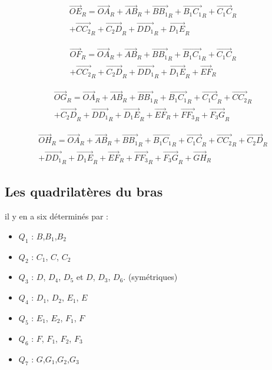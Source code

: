 \documentclass[12pt,a4paper]{article}
\begin{document}
\begin{equation}
\begin{split}
\vec{OE}_R=\vec{OA}_R+\vec{AB}_R+\vec{B B_1}_R+\vec{B_1 C_1}_R+\vec{C_1 C}_R\\+\vec{C C_2}_R+\vec{C_2 D}_R+\vec{D D_1}_R+\vec{D_1 E}_R
\end{split}
\end{equation}

\begin{equation}
\begin{split}
\vec{OF}_R=\vec{OA}_R+\vec{AB}_R+\vec{B B_1}_R+\vec{B_1 C_1}_R+\vec{C_1 C}_R\\+\vec{C C_2}_R+\vec{C_2 D}_R+\vec{D D_1}_R+\vec{D_1 E}_R+\vec{E F}_R
\end{split}
\end{equation}

\begin{equation}
\begin{split}
\vec{OG}_R=\vec{OA}_R+\vec{AB}_R+\vec{B B_1}_R+\vec{B_1 C_1}_R+\vec{C_1 C}_R+\vec{C C_2}_R\\+\vec{C_2 D}_R+\vec{D D_1}_R+\vec{D_1 E}_R+\vec{E F}_R+\vec{F F_3}_R+\vec{F_3 G}_R
\end{split}
\end{equation}

\begin{equation}
\begin{split}
\vec{OH}_R=\vec{OA}_R+\vec{AB}_R+\vec{B B_1}_R+\vec{B_1 C_1}_R+\vec{C_1 C}_R+\vec{C C_2}_R+\vec{C_2 D}_R\\+\vec{D D_1}_R+\vec{D_1 E}_R+\vec{E F}_R+\vec{F F_3}_R+\vec{F_3 G}_R+\vec{G H}_R
\end{split}
\end{equation}

\subsection{Les quadrilatères du bras}
il y en a six déterminés par : 

\begin{itemize}
	\item $Q_1$ : $B$,$B_1$,$B_2$
	\item $Q_2$ : $C_1$, $C$, $C_2$
	\item $Q_3$ : $D$, $D_4$, $D_5$ et $D$, $D_3$, $D_6$. (symétriques)
	\item $Q_4$ : $D_1$, $D_2$, $E_1$, $E$
	\item $Q_5$ : $E_1$, $E_2$, $F_1$, $F$
	\item $Q_6$ : $F$, $F_1$, $F_2$, $F_3$
	\item $Q_7$ : $G$,$G_1$,$G_2$,$G_3$
\end{itemize}
\end{document}
